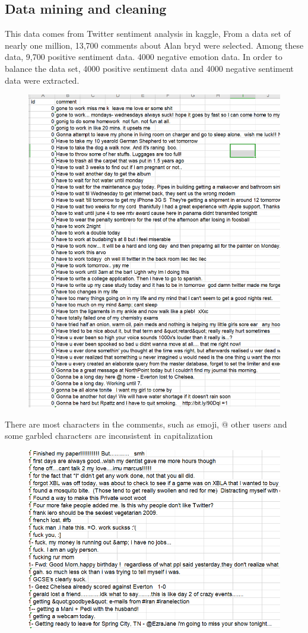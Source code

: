 \documentclass{article}
\begin{document}
\subsection{Data mining and cleaning}
This data comes from Twitter sentiment analysis in kaggle, From a data set of nearly one million, 13,700 comments about Alan bryd were selected. Among these data, 9,700 positive sentiment data. 4000 negative emotion data. In order to balance the data set, 4000 positive sentiment data and 4000 negative sentiment data were extracted.
 \begin{figure}[H]
\centering
  \includegraphics[width=1.0\textwidth]{3-1.png} %

\end{figure}
There are most characters in the comments, such as emoji, @ other users and some garbled characters are inconsistent in capitalization
 \begin{figure}[H]
\centering
  \includegraphics[width=.8\textwidth]{3-2.png} %
  \end{figure}
\end{document}
